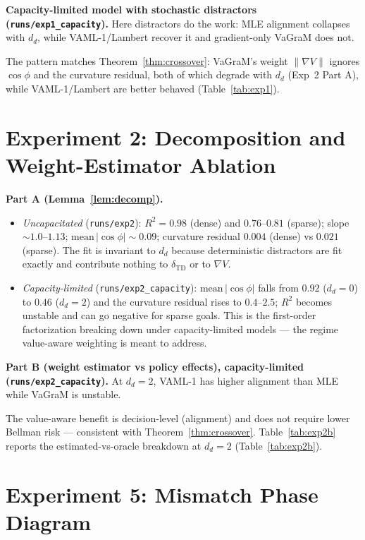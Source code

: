 \documentclass{article}
\theoremstyle{plain}
\begin{document}
\textbf{Capacity-limited model with stochastic distractors (\texttt{runs/exp1\_capacity}).}
Here distractors do the work: MLE alignment collapses with $d_d$, while VAML-1/Lambert
recover it and gradient-only VaGraM does not.

The pattern matches Theorem~\ref{thm:crossover}: VaGraM's weight
$\lVert \nabla V\rVert$ ignores $\cos\phi$ and the curvature residual, both of which
degrade with $d_d$ (Exp~2 Part A), while VAML-1/Lambert are better behaved
(Table~\ref{tab:exp1}).



\section{Experiment 2: Decomposition and Weight-Estimator Ablation}

\textbf{Part A (Lemma~\ref{lem:decomp}).}
\begin{itemize}
\item \emph{Uncapacitated} (\texttt{runs/exp2}): $R^2 = 0.98$ (dense) and $0.76$--$0.81$
  (sparse); slope $\sim 1.0$--$1.13$; $\mathrm{mean}\,\lvert\cos\phi\rvert \sim 0.09$;
  curvature residual $0.004$ (dense) vs $0.021$ (sparse). The fit is invariant to $d_d$
  because deterministic distractors are fit exactly and contribute nothing to
  $\delta_{\mathrm{TD}}$ or to $\nabla V$.
\item \emph{Capacity-limited} (\texttt{runs/exp2\_capacity}):
  $\mathrm{mean}\,\lvert\cos\phi\rvert$ falls from $0.92$ ($d_d = 0$) to $0.46$
  ($d_d = 2$) and the curvature residual rises to $0.4$--$2.5$; $R^2$ becomes unstable
  and can go negative for sparse goals. This is the first-order factorization breaking
  down under capacity-limited models --- the regime value-aware weighting is meant to
  address.
\end{itemize}

\textbf{Part B (weight estimator vs policy effects), capacity-limited
(\texttt{runs/exp2\_capacity}).} At $d_d = 2$, VAML-1 has higher alignment than MLE
while VaGraM is unstable.

The value-aware benefit is decision-level (alignment) and does not require lower
Bellman risk --- consistent with Theorem~\ref{thm:crossover}. Table~\ref{tab:exp2b}
reports the estimated-vs-oracle breakdown at $d_d = 2$ (Table~\ref{tab:exp2b}).

\section{Experiment 5: Mismatch Phase Diagram}
\label{sec:phase}
\end{document}
